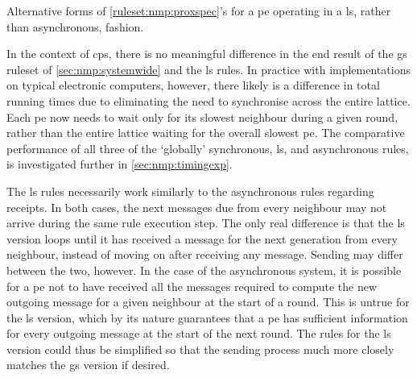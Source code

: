 \begin{cprulesetfloat}
    \begin{cpruleset}
    
        
        
    \end{cpruleset}
    \caption[Alternative forms of \cref{ruleset:nmp:proxspec}'s Rule 10]{\label{ruleset:nmp:localsync}Alternative forms of \cref{ruleset:nmp:proxspec}'s  for a \gls{pe} operating in a \gls{ls}, rather than asynchronous, fashion.}
\end{cprulesetfloat}

In the context of \gls{cps}, there is no meaningful difference in the end result of the \gls{gs} \gls{ruleset} of \cref{sec:nmp:systemwide} and the \gls{ls} rules.  In practice with implementations on typical electronic computers, however, there likely is a difference in total running times due to eliminating the need to synchronise across the entire lattice.  Each \gls{pe} now needs to wait only for its slowest neighbour during a given round, rather than the entire lattice waiting for the overall slowest \gls{pe}.  The comparative performance of all three of the `globally' synchronous, \gls{ls}, and asynchronous rules, is investigated further in \cref{sec:nmp:timingexp}.

The \gls{ls} rules necessarily work similarly to the asynchronous rules regarding receipts.  In both cases, the next messages due from every neighbour may not arrive during the same rule execution step.  The only real difference is that the \gls{ls} version loops until it has received a message for the next generation from every neighbour, instead of moving on after receiving any message.  Sending may differ between the two, however.  In the case of the asynchronous system, it is possible for a \gls{pe} not to have received all the messages required to compute the new outgoing message for a given neighbour at the start of a round.  This is untrue for the \gls{ls} version, which by its nature guarantees that a \gls{pe} has sufficient information for every outgoing message at the start of the next round.  The rules for the \gls{ls} version could thus be simplified so that the sending process much more closely matches the \gls{gs} version if desired.

